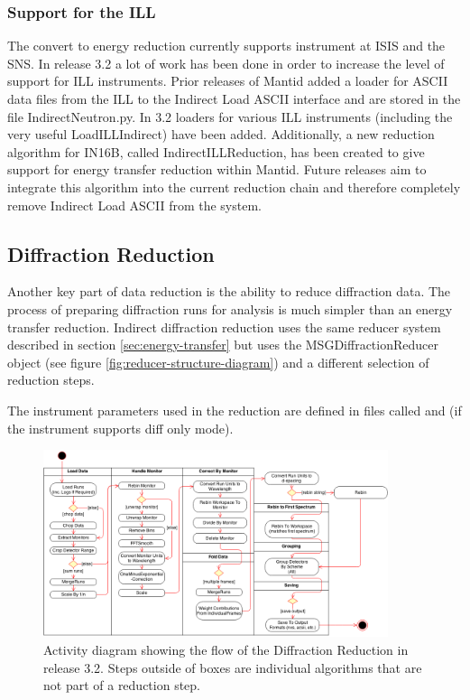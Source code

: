 \documentclass[paper=a4, fontsize=11pt]{scrartcl}	%
\numberwithin{equation}{section}															%
\numberwithin{figure}{section}																%
\numberwithin{table}{section}																%
\begin{document}
\subsubsection{Support for the ILL}
The convert to energy reduction currently supports instrument at ISIS and the SNS. In release 3.2 a lot of work has been done in order to increase the level of support for ILL instruments. Prior releases of Mantid added a loader for ASCII data files from the ILL to the Indirect Load ASCII interface and are stored in the file IndirectNeutron.py. In 3.2 loaders for various ILL instruments (including the very useful LoadILLIndirect) have been added. Additionally, a new reduction algorithm for IN16B, called IndirectILLReduction, has been created to give support for energy transfer reduction within Mantid. Future releases aim to integrate this algorithm into the current reduction chain and therefore completely remove Indirect Load ASCII from the system.

\subsection{Diffraction Reduction}
\label{subsec:indirect-diffraction}
Another key part of data reduction is the ability to reduce diffraction data. The process of preparing diffraction runs for analysis is much simpler than an energy transfer reduction. Indirect diffraction reduction uses the same reducer system described in section \ref{sec:energy-transfer} but uses the MSGDiffractionReducer object (see figure \ref{fig:reducer-structure-diagram}) and a different selection of reduction steps. 

The instrument parameters used in the reduction are defined in files called  and  (if the instrument supports diff only mode).

\begin{figure}[H]
\centering
\includegraphics[width=0.9\textwidth]{img/uml/activity_diagrams/DiffractionReduction_activity.png}
\caption{Activity diagram showing the flow of the Diffraction Reduction in release 3.2. Steps outside of boxes are individual algorithms that are not part of a reduction step.}
\label{fig:diffraction-class-diagram}
\end{figure}
\end{document}
